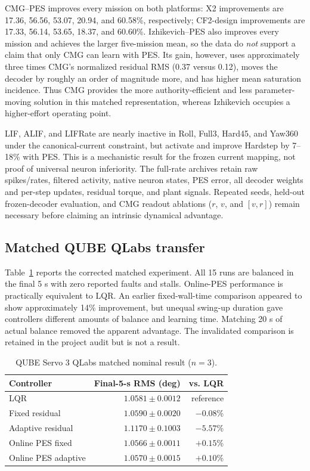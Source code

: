 \documentclass[10pt,twocolumn]{article}
\begin{document}
CMG--PES improves every mission on both platforms: X2 improvements are
17.36, 56.56, 53.07, 20.94, and 60.58\%, respectively; CF2-design improvements
are 17.33, 56.14, 53.65, 18.37, and 60.60\%.  Izhikevich--PES also improves
every mission and achieves the larger five-mission mean, so the data do
\emph{not} support a claim that only CMG can learn with PES.  Its gain, however,
uses approximately three times CMG's normalized residual RMS (0.37 versus
0.12), moves the decoder by roughly an order of magnitude more, and has higher
mean saturation incidence.  Thus CMG provides the more authority-efficient and
less parameter-moving solution in this matched representation, whereas
Izhikevich occupies a higher-effort operating point.

LIF, ALIF, and LIFRate are nearly inactive in Roll, Full3, Hard45, and Yaw360
under the canonical-current constraint, but activate and improve Hardstep by
7--18\% with PES.  This is a mechanistic result for the frozen current mapping,
not proof of universal neuron inferiority.  The full-rate archives retain raw
spikes/rates, filtered activity, native neuron states, PES error, all decoder
weights and per-step updates, residual torque, and plant signals.  Repeated
seeds, held-out frozen-decoder evaluation, and CMG readout ablations ($r$, $v$,
and $[v,r]$) remain necessary before claiming an intrinsic dynamical advantage.

\subsection{Matched QUBE QLabs transfer}

Table~\ref{tab:qube} reports the corrected matched experiment. All 15 runs are
balanced in the final 5 s with zero reported faults and stalls. Online-PES
performance is practically equivalent to LQR. An earlier fixed-wall-time
comparison appeared to show approximately 14\% improvement, but unequal
swing-up duration gave controllers different amounts of balance and learning
time. Matching 20 s of actual balance removed the apparent advantage. The
invalidated comparison is retained in the project audit but is not a result.

\begin{table}[t]
\centering
\caption{QUBE Servo 3 QLabs matched nominal result ($n=3$).}
\label{tab:qube}
\small
\begin{tabular}{lrr}
\toprule
Controller & Final-5-s RMS (deg) & vs. LQR \\
\midrule
LQR & $1.0581\pm0.0012$ & reference \\
Fixed residual & $1.0590\pm0.0020$ & $-0.08$\% \\
Adaptive residual & $1.1170\pm0.1003$ & $-5.57$\% \\
Online PES fixed & $1.0566\pm0.0011$ & $+0.15$\% \\
Online PES adaptive & $1.0570\pm0.0015$ & $+0.10$\% \\
\bottomrule
\end{tabular}
\end{table}
\end{document}
